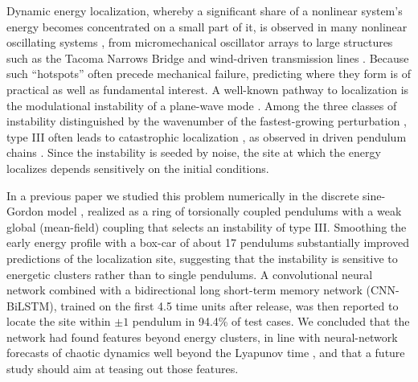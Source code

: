 \documentclass[11pt]{article}
\begin{document}
Dynamic energy localization, whereby a significant share of a nonlinear system's energy becomes concentrated on a small part of it, is observed in many nonlinear oscillating systems \cite{sievers1988intrinsic,campbell2004localizing,flach2008discrete}, from micromechanical oscillator arrays \cite{sato2006colloquium} to large structures such as the Tacoma Narrows Bridge \cite{green2006failure,ARIOLI2015901} and wind-driven transmission lines \cite{zhang2017wind}. Because such ``hotspots'' often precede mechanical failure, predicting where they form is of practical as well as fundamental interest. A well-known pathway to localization is the modulational instability of a plane-wave mode \cite{kivshar1993creation,dauxois1993energy,extreme}. Among the three classes of instability distinguished by the wavenumber of the fastest-growing perturbation \cite{cross1993pattern}, type III often leads to catastrophic localization \cite{english2003modulational}, as observed in driven pendulum chains \cite{thakur2007driven,cuevas2009discrete}. Since the instability is seeded by noise, the site at which the energy localizes depends sensitively on the initial conditions.

In a previous paper \cite{mittal2026jand} we studied this problem numerically in the discrete sine-Gordon model \cite{cuevas2014sine}, realized as a ring of torsionally coupled pendulums with a weak global (mean-field) coupling that selects an instability of type III. Smoothing the early energy profile with a box-car of about 17 pendulums substantially improved predictions of the localization site, suggesting that the instability is sensitive to energetic clusters rather than to single pendulums. A convolutional neural network combined with a bidirectional long short-term memory network \cite{Hochreiter1997} (CNN-BiLSTM), trained on the first 4.5 time units after release, was then reported to locate the site within $\pm1$ pendulum in 94.4\% of test cases. We concluded that the network had found features beyond energy clusters, in line with neural-network forecasts of chaotic dynamics well beyond the Lyapunov time \cite{Chaos_Ott_2017,PhysRevLett_Ott_2018}, and that a future study should aim at teasing out those features.
\end{document}

